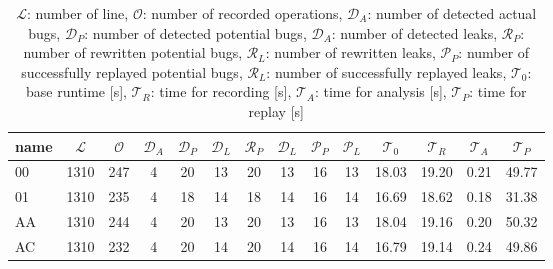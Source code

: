 \begin{table}[h]
\begin{tabular}{|l|c|c|c|c|c|c|c|c|c|c|c|c|c|}
\hline
name  & $\mathcal{L}$ & $\mathcal{O}$ & $\mathcal{D}_A$ & $\mathcal{D}_P$ & $\mathcal{D}_L$ & $\mathcal{R}_P$ & $\mathcal{D}_L$ & $\mathcal{P}_P$ & $\mathcal{P}_L$ & $\mathcal{T}_0$ & $\mathcal{T}_R$ & $\mathcal{T}_A$ & $\mathcal{T}_P$ \\ \hline
00 & 1310 & 247 & 4 & 20 & 13 & 20 & 13 & 16 & 13 & 18.03 & 19.20 & 0.21 & 49.77 \\ \hline
01 & 1310 & 235 & 4 & 18 & 14 & 18 & 14 & 16 & 14 & 16.69 & 18.62 & 0.18 & 31.38 \\ \hline
AA & 1310 & 244 & 4 & 20 & 13 & 20 & 13 & 16 & 13 & 18.04 & 19.16 & 0.20 & 50.32 \\ \hline
AC & 1310 & 232 & 4 & 20 & 14 & 20 & 14 & 16 & 14 & 16.79 & 19.14 & 0.24 & 49.86 \\ \hline
\end{tabular}
\caption{$\mathcal{L}$: number of line, $\mathcal{O}$: number of recorded operations, $\mathcal{D}_A$: number of detected actual bugs, $\mathcal{D}_P$: number of detected potential bugs, $\mathcal{D}_A$: number of detected leaks, $\mathcal{R}_P$: number of rewritten potential bugs, $\mathcal{R}_L$: number of rewritten leaks, $\mathcal{P}_P$: number of successfully replayed potential bugs, $\mathcal{R}_L$: number of successfully replayed leaks, $\mathcal{T}_0$: base runtime [s], $\mathcal{T}_R$: time for recording [s], $\mathcal{T}_A$: time for analysis [s], $\mathcal{T}_P$: time for replay [s]}
\label{}
\end{table}